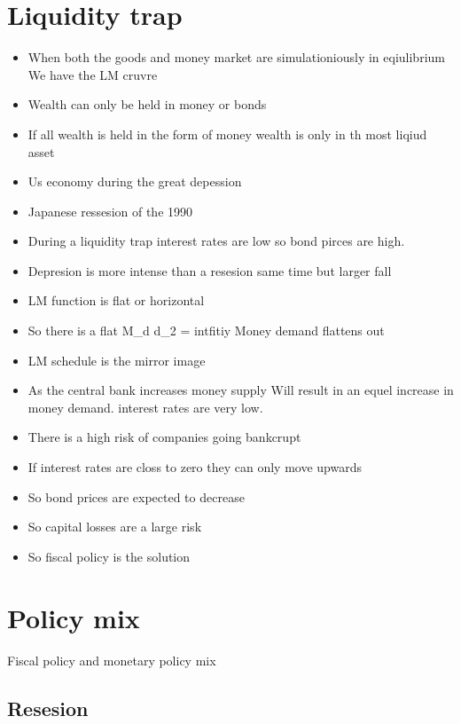 \documentclass[twocolumn]{article}
\providecommand{\tightlist}{%
  \setlength{\itemsep}{0pt}\setlength{\parskip}{0pt}}
\begin{document}
\hypertarget{liquidity-trap}{%
\section{Liquidity trap}\label{liquidity-trap}}

\begin{itemize}
\tightlist
\item
  When both the goods and money market are simulationiously in
  eqiulibrium We have the LM cruvre
\item
  Wealth can only be held in money or bonds
\item
  If all wealth is held in the form of money wealth is only in th most
  liqiud asset
\item
  Us economy during the great depession
\item
  Japanese ressesion of the 1990
\item
  During a liquidity trap interest rates are low so bond pirces are
  high.
\item
  Depresion is more intense than a resesion same time but larger fall
\item
  LM function is flat or horizontal
\item
  So there is a flat M\_d d\_2 = intfitiy Money demand flattens out
\item
  LM schedule is the mirror image
\item
  As the central bank increases money supply Will result in an equel
  increase in money demand. interest rates are very low.
\item
  There is a high risk of companies going bankcrupt
\item
  If interest rates are closs to zero they can only move upwards
\item
  So bond prices are expected to decrease
\item
  So capital losses are a large risk
\item
  So fiscal policy is the solution
\end{itemize}

\hypertarget{policy-mix}{%
\section{Policy mix}\label{policy-mix}}

Fiscal policy and monetary policy mix

\hypertarget{resesion}{%
\subsection{Resesion}\label{resesion}}
\end{document}
